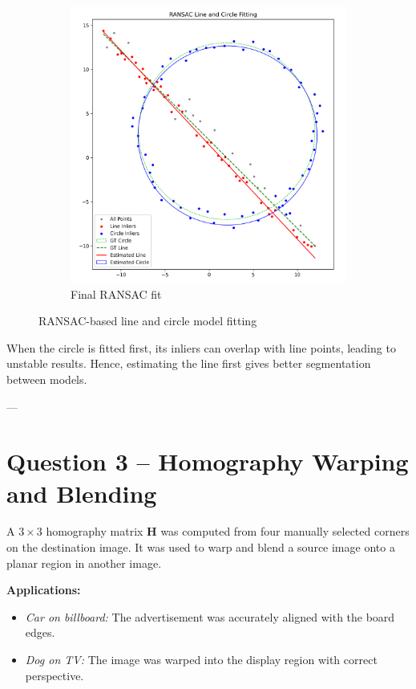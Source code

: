\documentclass[11pt,a4paper]{article}
\begin{document}
\begin{figure}[H]
\begin{subfigure}{0.31\textwidth}
\includegraphics[width=\linewidth]{figures/q2_ransac_final.png}
\caption{Final RANSAC fit}
\end{subfigure}
\caption{RANSAC-based line and circle model fitting}
\end{figure}

When the circle is fitted first, its inliers can overlap with line points, leading to unstable results.  
Hence, estimating the line first gives better segmentation between models.

---

\section*{Question 3 – Homography Warping and Blending}
A $3\times3$ homography matrix $\mathbf{H}$ was computed from four manually selected corners on the destination image.  
It was used to warp and blend a source image onto a planar region in another image.

\textbf{Applications:}
\begin{itemize}
\item \textit{Car on billboard:} The advertisement was accurately aligned with the board edges.
\item \textit{Dog on TV:} The image was warped into the display region with correct perspective.
\end{itemize}
\end{document}
